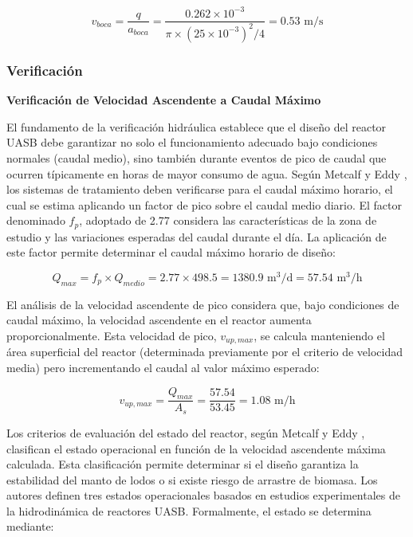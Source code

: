 \documentclass[12pt,a4paper]{article}
\begin{document}
\begin{equation}
v_{boca} = \frac{q}{a_{boca}} = \frac{0.262 \times 10^{-3}}{\pi \times (25 \times 10^{-3})^2 / 4} = 0.53 \text{ m/s}
\end{equation}

\subsubsection{Verificación}

\textbf{Verificación de Velocidad Ascendente a Caudal Máximo}

El fundamento de la verificación hidráulica establece que el diseño del reactor UASB debe garantizar no solo el funcionamiento adecuado bajo condiciones normales (caudal medio), sino también durante eventos de pico de caudal que ocurren típicamente en horas de mayor consumo de agua. Según Metcalf y Eddy \cite{metcalf2014}, los sistemas de tratamiento deben verificarse para el caudal máximo horario, el cual se estima aplicando un factor de pico sobre el caudal medio diario. El factor denominado $f_p$, adoptado de 2.77 considera las características de la zona de estudio y las variaciones esperadas del caudal durante el día. La aplicación de este factor permite determinar el caudal máximo horario de diseño:

\begin{equation}
Q_{max} = f_p \times Q_{medio} = 2.77 \times 498.5 = 1380.9 \text{ m}^3\text{/d} = 57.54 \text{ m}^3\text{/h}
\end{equation}

El análisis de la velocidad ascendente de pico considera que, bajo condiciones de caudal máximo, la velocidad ascendente en el reactor aumenta proporcionalmente. Esta velocidad de pico, $v_{up,max}$, se calcula manteniendo el área superficial del reactor (determinada previamente por el criterio de velocidad media) pero incrementando el caudal al valor máximo esperado:

\begin{equation}
v_{up,max} = \frac{Q_{max}}{A_s} = \frac{57.54}{53.45} = 1.08 \text{ m/h}
\end{equation}

Los criterios de evaluación del estado del reactor, según Metcalf y Eddy \cite{metcalf2014}, clasifican el estado operacional en función de la velocidad ascendente máxima calculada. Esta clasificación permite determinar si el diseño garantiza la estabilidad del manto de lodos o si existe riesgo de arrastre de biomasa. Los autores definen tres estados operacionales basados en estudios experimentales de la hidrodinámica de reactores UASB. Formalmente, el estado se determina mediante:
\end{document}
